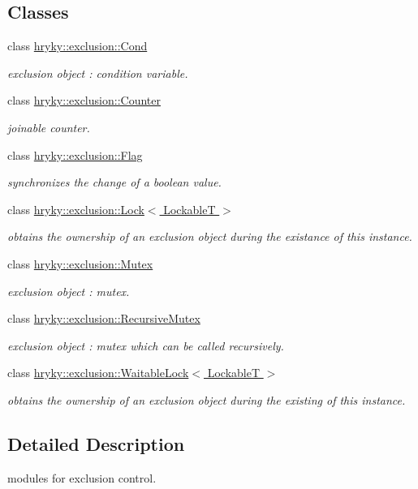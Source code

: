 \subsection*{Classes}
\begin{DoxyCompactItemize}
\item 
class \hyperlink{classhryky_1_1exclusion_1_1_cond}{hryky\-::exclusion\-::\-Cond}
\begin{DoxyCompactList}\small\item\em exclusion object \-: condition variable. \end{DoxyCompactList}\item 
class \hyperlink{classhryky_1_1exclusion_1_1_counter}{hryky\-::exclusion\-::\-Counter}
\begin{DoxyCompactList}\small\item\em joinable counter. \end{DoxyCompactList}\item 
class \hyperlink{classhryky_1_1exclusion_1_1_flag}{hryky\-::exclusion\-::\-Flag}
\begin{DoxyCompactList}\small\item\em synchronizes the change of a boolean value. \end{DoxyCompactList}\item 
class \hyperlink{classhryky_1_1exclusion_1_1_lock}{hryky\-::exclusion\-::\-Lock$<$ Lockable\-T $>$}
\begin{DoxyCompactList}\small\item\em obtains the ownership of an exclusion object during the existance of this instance. \end{DoxyCompactList}\item 
class \hyperlink{classhryky_1_1exclusion_1_1_mutex}{hryky\-::exclusion\-::\-Mutex}
\begin{DoxyCompactList}\small\item\em exclusion object \-: mutex. \end{DoxyCompactList}\item 
class \hyperlink{classhryky_1_1exclusion_1_1_recursive_mutex}{hryky\-::exclusion\-::\-Recursive\-Mutex}
\begin{DoxyCompactList}\small\item\em exclusion object \-: mutex which can be called recursively. \end{DoxyCompactList}\item 
class \hyperlink{classhryky_1_1exclusion_1_1_waitable_lock}{hryky\-::exclusion\-::\-Waitable\-Lock$<$ Lockable\-T $>$}
\begin{DoxyCompactList}\small\item\em obtains the ownership of an exclusion object during the existing of this instance. \end{DoxyCompactList}\end{DoxyCompactItemize}


\subsection{Detailed Description}
modules for exclusion control. 